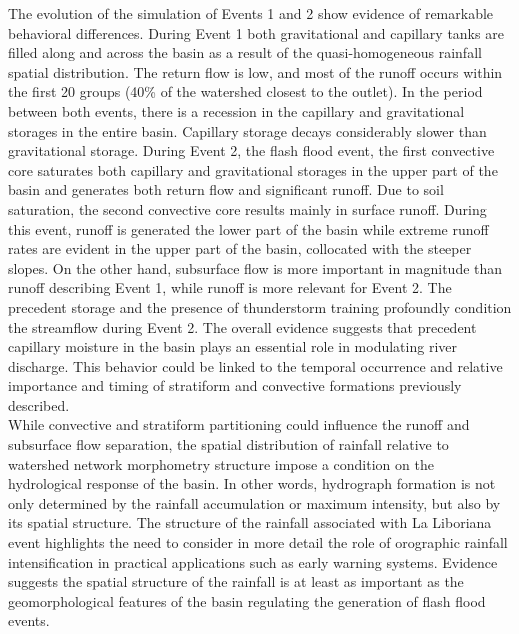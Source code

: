 \documentclass[hess, manuscript]{copernicus} %
\providecommand{\DIFadd}[1]{{\protect\color{blue}\uwave{#1}}} %
\providecommand{\DIFaddbegin}{} %
\providecommand{\DIFaddend}{} %
\begin{document}
The evolution of the simulation of Events 1 and 2 show evidence of remarkable behavioral differences. During Event 1 both gravitational and capillary tanks are filled along and across the basin as a result of the quasi-homogeneous rainfall spatial distribution. The return flow is low, and most of the runoff occurs within the first 20 groups (40\% of the watershed closest to the outlet).   In the period between both events, there is a recession in the capillary and gravitational storages in the entire basin. Capillary storage decays considerably slower than gravitational storage.  During Event 2, the flash flood \DIFaddbegin \DIFadd{triggering }\DIFaddend event,  the first convective core saturates both capillary and gravitational storages in the upper part of the basin and generates both return flow and significant runoff.   Due to soil saturation, the second convective core results mainly in surface runoff. During this event, runoff is generated the lower part of the basin while extreme runoff rates are evident in the upper part of the basin, collocated with the steeper slopes. On the other hand, subsurface flow is more important in magnitude than runoff describing Event 1, while runoff is more relevant for Event 2. The precedent storage and the presence of thunderstorm training profoundly condition the streamflow during Event 2. The overall evidence suggests that precedent capillary moisture in the basin plays an essential role in modulating river discharge. This behavior could be linked to the temporal occurrence and relative importance and timing of stratiform and convective formations previously described. \\

While convective and stratiform partitioning could influence the runoff and subsurface flow separation,  the spatial distribution of rainfall relative to watershed network morphometry structure impose a condition on the hydrological response of the basin. In other words, hydrograph formation is not only determined by the rainfall accumulation or maximum intensity, but also by its spatial structure. The structure of the rainfall associated with La Liboriana event highlights the need to consider in more detail the role of orographic rainfall intensification in practical applications such as early warning systems. Evidence suggests the spatial structure of the rainfall is at least as important as the geomorphological features of the basin regulating the generation of flash flood events.\\
\end{document}
